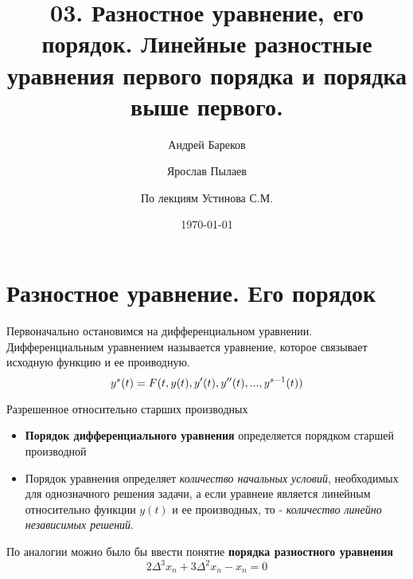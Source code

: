 \documentclass[a4paper,11pt]{article}
\title{03. Разностное уравнение, его порядок. Линейные разностные уравнения первого порядка и порядка выше первого.}
\author{Андрей Бареков \and Ярослав Пылаев \and По лекциям Устинова С.М.}
\date{\today}
\begin{document}
\maketitle
\newpage

\section{Разностное уравнение. Его порядок}
  Первоначально остановимся на дифференциальном уравнении. Дифференциальным уравнением называется уравнение, которое связывает исходную функцию и ее проиводную.
  \begin{equation}
  y^{s}(t) = F(t, y(t), y'(t), y''(t), ..., y^{s-1}(t)) \\
  \end{equation}
  \begin{center}
  Разрешенное относительно старших производных
  \end{center}

  \begin{itemize}
    \item \textbf{Порядок дифференциального уравнения} определяется порядком старшей производной
    \item Порядок уравнения определяет \textit{количество начальных условий}, необходимых для однозначного решения задачи, а если уравнеие является линейным относительно функции $y(t)$ и ее производных, то - \textit{количество линейно независимых решений}.
  \end{itemize}

  По аналогии можно было бы ввести понятие \textbf{порядка разностного уравнения}
  \begin{equation}
    2\Delta^3 x_n + 3\Delta^2 x_n - x_n = 0
    \label{eq:DiffEq}
  \end{equation}
\end{document}
